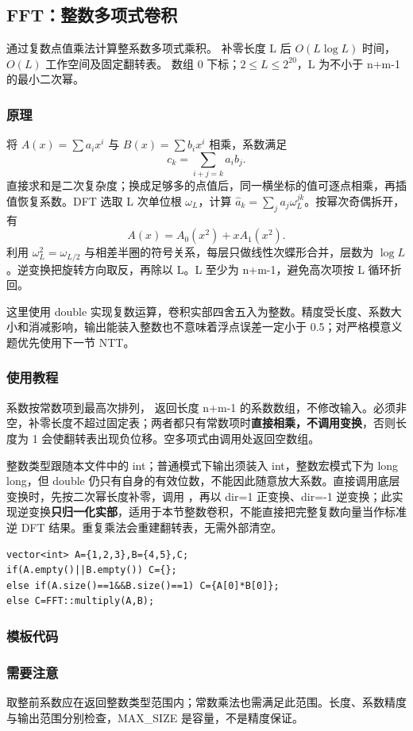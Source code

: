 \subsection{FFT：整数多项式卷积}
\label{math:fft}
\AlgorithmInfo
    {通过复数点值乘法计算整系数多项式乘积。}
    {补零长度 L 后 $O(L\log L)$ 时间，$O(L)$ 工作空间及固定翻转表。}
    {数组 0 下标；$2\le L\le2^{20}$，L 为不小于 n+m-1 的最小二次幂。}
\subsubsection*{原理}
将 $A(x)=\sum a_ix^i$ 与 $B(x)=\sum b_ix^i$ 相乘，系数满足
\[
 c_k=\sum_{i+j=k}a_i b_j.
\]
直接求和是二次复杂度；换成足够多的点值后，同一横坐标的值可逐点相乘，再插值恢复系数。DFT 选取 L 次单位根 $\omega_L$，计算 $\widehat a_k=\sum_j a_j\omega_L^{jk}$。按幂次奇偶拆开，有
\[
 A(x)=A_0(x^2)+xA_1(x^2).
\]
利用 $\omega_L^2=\omega_{L/2}$ 与相差半圈的符号关系，每层只做线性次蝶形合并，层数为 $\log L$。逆变换把旋转方向取反，再除以 L。L 至少为 n+m-1，避免高次项按 L 循环折回。

这里使用 double 实现复数运算，卷积实部四舍五入为整数。精度受长度、系数大小和消减影响，输出能装入整数也不意味着浮点误差一定小于 0.5；对严格模意义题优先使用下一节 NTT。
\subsubsection*{使用教程}
系数按常数项到最高次排列， 返回长度 n+m-1 的系数数组，不修改输入。必须非空，补零长度不超过固定表；两者都只有常数项时\textbf{直接相乘，不调用变换}，否则长度为 1 会使翻转表出现负位移。空多项式由调用处返回空数组。

整数类型跟随本文件中的 int；普通模式下输出须装入 int，整数宏模式下为 long long，但 double 仍只有自身的有效位数，不能因此随意放大系数。直接调用底层变换时，先按二次幂长度补零，调用 ，再以 dir=1 正变换、dir=-1 逆变换；此实现逆变换\textbf{只归一化实部}，适用于本节整数卷积，不能直接把完整复数向量当作标准逆 DFT 结果。重复乘法会重建翻转表，无需外部清空。
\begin{lstlisting}[style=mtycpp,numbers=none]
vector<int> A={1,2,3},B={4,5},C;
if(A.empty()||B.empty()) C={};
else if(A.size()==1&&B.size()==1) C={A[0]*B[0]};
else C=FFT::multiply(A,B);
\end{lstlisting}
\subsubsection*{模板代码}
\subsubsection*{需要注意}
取整前系数应在返回整数类型范围内；常数乘法也需满足此范围。长度、系数精度与输出范围分别检查，MAX\_SIZE 是容量，不是精度保证。
